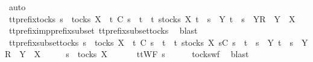 \ auto\isanewline
{}\isamarkupfalse%
%
\endisatagproof
{\isafoldproof}%
%
\isadelimproof
\isanewline
%
\endisadelimproof
\isanewline
{}\isamarkupfalse%
\ tt{\isacharunderscore}prefix{\isacharunderscore}tocks{\isacharcolon}\ {\isachardoublequoteopen}s\ {\isasymin}\ tocks\ X\ {\isasymLongrightarrow}\ t\ {\isasymle}\isactrlsub C\ s\ {\isasymLongrightarrow}\ t\ {\isasymin}\ {\isacharbraceleft}t{\isachardot}\ {\isasymexists}s{\isasymin}tocks\ X{\isachardot}\ t\ {\isacharequal}\ s\ {\isasymor}\ {\isacharparenleft}{\isasymexists}Y{\isachardot}\ t\ {\isacharequal}\ s\ {\isacharat}\ {\isacharbrackleft}{\isacharbrackleft}Y{\isacharbrackright}\isactrlsub R{\isacharbrackright}\ {\isasymand}\ Y\ {\isasymsubseteq}\ X{\isacharparenright}{\isacharbraceright}{\isachardoublequoteclose}\isanewline
%
\isadelimproof
\ \ %
\endisadelimproof
%
\isatagproof
{}\isamarkupfalse%
\ tt{\isacharunderscore}prefix{\isacharunderscore}imp{\isacharunderscore}prefix{\isacharunderscore}subset\ tt{\isacharunderscore}prefix{\isacharunderscore}subset{\isacharunderscore}tocks\ \isamarkupfalse%
\ blast%
\endisatagproof
{\isafoldproof}%
%
\isadelimproof
\isanewline
%
\endisadelimproof
\isanewline
{}\isamarkupfalse%
\ tt{\isacharunderscore}prefix{\isacharunderscore}subset{\isacharunderscore}tocks{}{\isacharcolon}\ {\isachardoublequoteopen}s\ {\isasymin}\ tocks\ X\ {\isasymLongrightarrow}\ t\ {\isasymlesssim}\isactrlsub C\ s\ {\isasymLongrightarrow}\ t\ {\isasymin}\ {\isacharbraceleft}t{\isachardot}\ {\isasymexists}s{\isacharprime}{\isasymin}tocks\ X{\isachardot}\ s{\isacharprime}{\isasymlesssim}\isactrlsub C\ s\ {\isasymand}\ {\isacharparenleft}t\ {\isacharequal}\ s{\isacharprime}\ {\isasymor}\ {\isacharparenleft}{\isasymexists}Y{\isachardot}\ t\ {\isacharequal}\ s{\isacharprime}\ {\isacharat}\ {\isacharbrackleft}{\isacharbrackleft}Y{\isacharbrackright}\isactrlsub R{\isacharbrackright}\ {\isasymand}\ Y\ {\isasymsubseteq}\ X{\isacharparenright}{\isacharparenright}{\isacharbraceright}{\isachardoublequoteclose}\isanewline
%
\isadelimproof
%
\endisadelimproof
%
\isatagproof
{}\isamarkupfalse%
\ {\isacharminus}\isanewline
\ \ \isamarkupfalse%
\ {\isachardoublequoteopen}s\ {\isasymin}\ tocks\ X{\isachardoublequoteclose}\ \isanewline
\ \ \isamarkupfalse%
\ \isamarkupfalse%
\ {\isachardoublequoteopen}ttWF\ s{\isachardoublequoteclose}\isanewline
\ \ \ \ \isamarkupfalse%
\ tocks{\isacharunderscore}wf\ \isamarkupfalse%
\ blast\isanewline
